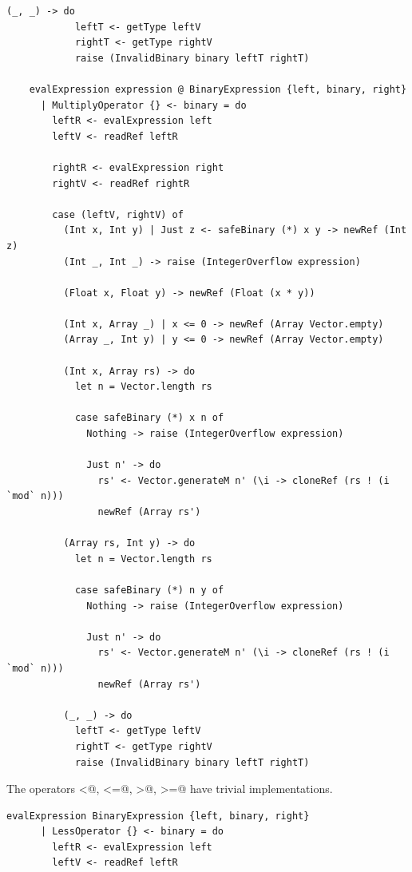 \documentclass[UdineBachThesis,american,11pt]{PhdThesis}
\begin{document}
  \newpage

  \begin{lstlisting}[gobble=4,basicstyle=\ttfamily\small]
          (_, _) -> do
            leftT <- getType leftV
            rightT <- getType rightV
            raise (InvalidBinary binary leftT rightT)

    evalExpression expression @ BinaryExpression {left, binary, right}
      | MultiplyOperator {} <- binary = do
        leftR <- evalExpression left
        leftV <- readRef leftR

        rightR <- evalExpression right
        rightV <- readRef rightR

        case (leftV, rightV) of
          (Int x, Int y) | Just z <- safeBinary (*) x y -> newRef (Int z)
          (Int _, Int _) -> raise (IntegerOverflow expression)

          (Float x, Float y) -> newRef (Float (x * y))

          (Int x, Array _) | x <= 0 -> newRef (Array Vector.empty)
          (Array _, Int y) | y <= 0 -> newRef (Array Vector.empty)

          (Int x, Array rs) -> do
            let n = Vector.length rs

            case safeBinary (*) x n of
              Nothing -> raise (IntegerOverflow expression)

              Just n' -> do
                rs' <- Vector.generateM n' (\i -> cloneRef (rs ! (i `mod` n)))
                newRef (Array rs')

          (Array rs, Int y) -> do
            let n = Vector.length rs

            case safeBinary (*) n y of
              Nothing -> raise (IntegerOverflow expression)

              Just n' -> do
                rs' <- Vector.generateM n' (\i -> cloneRef (rs ! (i `mod` n)))
                newRef (Array rs')

          (_, _) -> do
            leftT <- getType leftV
            rightT <- getType rightV
            raise (InvalidBinary binary leftT rightT)
  \end{lstlisting}

  The operators \lstinline@<@, \lstinline@<=@, \lstinline@>@, \lstinline@>=@
  have trivial implementations.

  \begin{lstlisting}[gobble=4,basicstyle=\ttfamily\small]
    evalExpression BinaryExpression {left, binary, right}
      | LessOperator {} <- binary = do
        leftR <- evalExpression left
        leftV <- readRef leftR
  \end{lstlisting}
\end{document}
